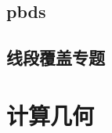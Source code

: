 \documentclass[a4paper,11pt]{article}
\begin{document}
    \subsection{pbds}
    
    
     \subsection{线段覆盖专题}
    




    \newpage
    \section{计算几何}


\end{document}

